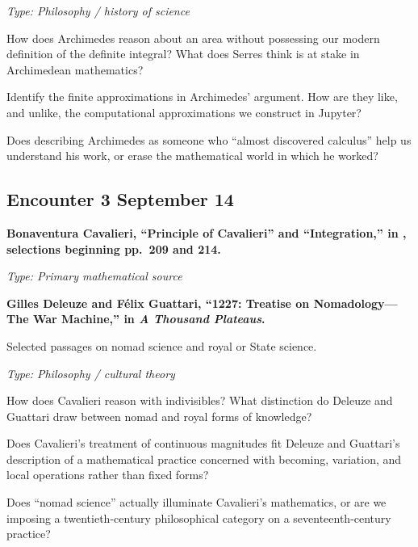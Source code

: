 \textit{Type: Philosophy / history of science}

\begin{description}[leftmargin=1.15in,style=nextline]
\item[\textcolor{LangRed}{READ}]
How does Archimedes reason about an area without possessing our modern
definition of the definite integral? What does Serres think is at stake in
Archimedean mathematics?
\item[\textcolor{LangRed}{CONNECT}]
Identify the finite approximations in Archimedes' argument. How are they like,
and unlike, the computational approximations we construct in Jupyter?
\item[\textcolor{LangRed}{QUESTION}]
Does describing Archimedes as someone who ``almost discovered calculus'' help
us understand his work, or erase the mathematical world in which he worked?
\end{description}

\subsection*{Encounter 3 \hfill September 14}

\textbf{Bonaventura Cavalieri, ``Principle of Cavalieri'' and
``Integration,'' in \textcite{struik1986}, selections beginning
pp.~209 and 214.}

\textit{Type: Primary mathematical source}

\medskip

\textbf{Gilles Deleuze and Félix Guattari, ``1227: Treatise on
Nomadology---The War Machine,'' in \emph{A Thousand Plateaus}.}

Selected passages on nomad science and royal or State science.
\parencite{deleuzeguattari1987}

\textit{Type: Philosophy / cultural theory}

\begin{description}[leftmargin=1.15in,style=nextline]

\item[\textcolor{LangRed}{READ}]
How does Cavalieri reason with indivisibles? What distinction do
Deleuze and Guattari draw between nomad and royal forms of knowledge?

\item[\textcolor{LangRed}{CONNECT}]
Does Cavalieri's treatment of continuous magnitudes fit Deleuze and
Guattari's description of a mathematical practice concerned with
becoming, variation, and local operations rather than fixed forms?

\item[\textcolor{LangRed}{QUESTION}]
Does ``nomad science'' actually illuminate Cavalieri's mathematics,
or are we imposing a twentieth-century philosophical category on a
seventeenth-century practice?

\end{description}


